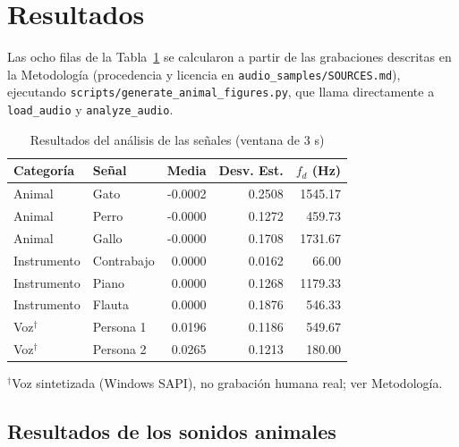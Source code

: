 
\section{Resultados}

Las ocho filas de la Tabla~\ref{tab:resultados} se calcularon a partir de las grabaciones descritas en la Metodología (procedencia y licencia en \texttt{audio\_samples/SOURCES.md}), ejecutando \texttt{scripts/generate\_animal\_figures.py}, que llama directamente a \texttt{load\_audio} y \texttt{analyze\_audio}.

\begin{table}[!t]
\centering
\caption{Resultados del análisis de las señales (ventana de 3 s)}
\label{tab:resultados}
\small
\begin{tabular}{@{}l l r r r@{}}
\toprule
Categoría & Señal & Media & Desv. Est. & $f_d$ (Hz) \\
\midrule

Animal & Gato & -0.0002 & 0.2508 & 1545.17 \\
Animal & Perro & -0.0000 & 0.1272 & 459.73 \\
Animal & Gallo & -0.0000 & 0.1708 & 1731.67 \\

\midrule

Instrumento & Contrabajo & 0.0000 & 0.0162 & 66.00 \\
Instrumento & Piano & 0.0000 & 0.1268 & 1179.33 \\
Instrumento & Flauta & 0.0000 & 0.1876 & 546.33 \\

\midrule

Voz$^{\dagger}$ & Persona 1 & 0.0196 & 0.1186 & 549.67 \\
Voz$^{\dagger}$ & Persona 2 & 0.0265 & 0.1213 & 180.00 \\

\bottomrule
\end{tabular}

\vspace{2pt}
{\footnotesize $^{\dagger}$Voz sintetizada (Windows SAPI), no grabación humana real; ver Metodología.}
\end{table}

\subsection{Resultados de los sonidos animales}

